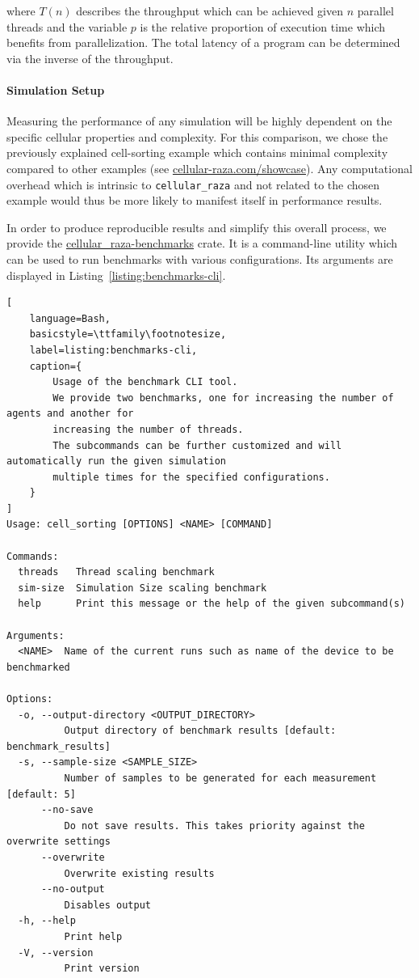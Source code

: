 \documentclass[a4paper]{article}
\begin{document}
where $T(n)$ describes the throughput which can be achieved given $n$ parallel threads and the
variable $p$ is the relative proportion of execution time which benefits from parallelization.
The total latency of a program can be determined via the inverse of the throughput.

\paragraph{Simulation Setup}
Measuring the performance of any simulation will be highly dependent on the specific cellular 
properties and complexity.
For this comparison, we chose the previously explained cell-sorting example which contains minimal
complexity compared to other examples (see
\href{https://cellular-raza.com/showcase}{cellular-raza.com/showcase}).
Any computational overhead which is intrinsic to \texttt{cellular\_raza} and not related to the
chosen example would thus be more likely to manifest itself in performance results.

In order to produce reproducible results and simplify this overall process, we provide the
\href{https://github.com/jonaspleyer/cellular_raza/tree/master/cellular_raza-benchmarks}{cellular\_raza-benchmarks} crate.
It is a command-line utility which can be used to run benchmarks with various configurations.
Its arguments are displayed in Listing~\ref{listing:benchmarks-cli}.

\begin{minipage}{\linewidth}\begin{lstlisting}[
    language=Bash,
    basicstyle=\ttfamily\footnotesize,
    label=listing:benchmarks-cli,
    caption={
        Usage of the benchmark CLI tool.
        We provide two benchmarks, one for increasing the number of agents and another for
        increasing the number of threads.
        The subcommands can be further customized and will automatically run the given simulation
        multiple times for the specified configurations.
    }
]
Usage: cell_sorting [OPTIONS] <NAME> [COMMAND]

Commands:
  threads   Thread scaling benchmark
  sim-size  Simulation Size scaling benchmark
  help      Print this message or the help of the given subcommand(s)

Arguments:
  <NAME>  Name of the current runs such as name of the device to be benchmarked

Options:
  -o, --output-directory <OUTPUT_DIRECTORY>
          Output directory of benchmark results [default: benchmark_results]
  -s, --sample-size <SAMPLE_SIZE>
          Number of samples to be generated for each measurement [default: 5]
      --no-save
          Do not save results. This takes priority against the overwrite settings
      --overwrite
          Overwrite existing results
      --no-output
          Disables output
  -h, --help
          Print help
  -V, --version
          Print version
\end{lstlisting}\end{minipage}
\end{document}
